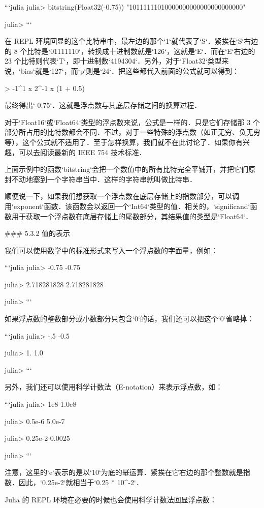 ```julia
julia> bitstring(Float32(-0.75))
"10111111010000000000000000000000"

julia> 
```

在 REPL 环境回显的这个比特串中，最左边的那个`1`就代表了`S`．紧挨在`S`右边的 8 个比特是`01111110`，转换成十进制数就是`126`，这就是`E`．而在`E`右边的 23 个比特则代表`T`，即十进制数`4194304`．另外，对于`Float32`类型来说，`bias`就是`127`，而`p`则是`24`．把这些都代入前面的公式就可以得到：

> -1^1 x 2^-1 x (1 + 0.5) 

最终得出`-0.75`．这就是浮点数与其底层存储之间的换算过程．

对于`Float16`或`Float64`类型的浮点数来说，公式是一样的．只是它们存储那 3 个部分所占用的比特数都会不同．不过，对于一些特殊的浮点数（如正无穷、负无穷等），这个公式就不适用了．至于怎样换算，我们就不在此讨论了．如果你有兴趣，可以去阅读最新的 IEEE 754 技术标准．

上面示例中的函数`bitstring`会把一个数值中的所有比特完全平铺开，并把它们原封不动地塞到一个字符串当中．这样的字符串就叫做比特串．

顺便说一下，如果我们想获取一个浮点数在底层存储上的指数部分，可以调用`exponent`函数．该函数会以返回一个`Int64`类型的值．相关的，`significand`函数用于获取一个浮点数在底层存储上的尾数部分，其结果值的类型是`Float64`．

### 5.3.2 值的表示

我们可以使用数学中的标准形式来写入一个浮点数的字面量，例如：

```julia
julia> -0.75
-0.75

julia> 2.718281828
2.718281828

julia> 
```

如果浮点数的整数部分或小数部分只包含`0`的话，我们还可以把这个`0`省略掉：

```julia
julia> -.5
-0.5

julia> 1.
1.0

julia> 
```

另外，我们还可以使用科学计数法（E-notation）来表示浮点数，如：

```julia
julia> 1e8
1.0e8

julia> 0.5e-6
5.0e-7

julia> 0.25e-2
0.0025

julia> 
```

注意，这里的`e`表示的是以`10`为底的幂运算．紧挨在它右边的那个整数就是指数．因此，`0.25e-2`就相当于`0.25 * 10^-2`．

Julia 的 REPL 环境在必要的时候也会使用科学计数法回显浮点数：

